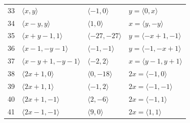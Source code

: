 \documentclass[11pt]{article}
\begin{document}
\begin{longtable}{@{}rlll@{}}
33 & $\langle x,y\rangle$ & $\langle -1,0\rangle$ & $y=\langle 0,x\rangle$\\
34 & $\langle x-y,y\rangle$ & $\langle 1,0\rangle$ & $x=\langle y,-y\rangle$\\
35 & $\langle x+y-1,1\rangle$ & $\langle -27,-27\rangle$ & $y=\langle -x+1,-1\rangle$\\
36 & $\langle x-1,-y-1\rangle$ & $\langle -1,-1\rangle$ & $y=\langle -1,-x+1\rangle$\\
37 & $\langle x-y+1,-y-1\rangle$ & $\langle -2,2\rangle$ & $x=\langle y-1,y+1\rangle$\\
38 & $\langle 2x+1,0\rangle$ & $\langle 0,-18\rangle$ & $2x=\langle -1,0\rangle$\\
39 & $\langle 2x+1,1\rangle$ & $\langle -1,2\rangle$ & $2x=\langle -1,-1\rangle$\\
40 & $\langle 2x+1,-1\rangle$ & $\langle 2,-6\rangle$ & $2x=\langle -1,1\rangle$\\
41 & $\langle 2x-1,-1\rangle$ & $\langle 9,0\rangle$ & $2x=\langle 1,1\rangle$\\
\end{longtable}
\endgroup
\end{document}

